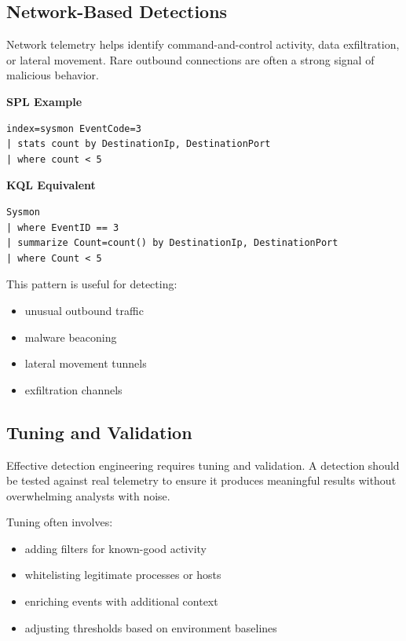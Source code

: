 
\subsection*{Network-Based Detections}

Network telemetry helps identify command-and-control activity, data exfiltration, or lateral movement. Rare outbound 
connections are often a strong signal of malicious behavior.

\textbf{SPL Example}

\begin{lstlisting}
index=sysmon EventCode=3
| stats count by DestinationIp, DestinationPort
| where count < 5
\end{lstlisting}

\textbf{KQL Equivalent}

\begin{lstlisting}
Sysmon
| where EventID == 3
| summarize Count=count() by DestinationIp, DestinationPort
| where Count < 5
\end{lstlisting}

This pattern is useful for detecting:

\begin{itemize}
    \item unusual outbound traffic
    \item malware beaconing
    \item lateral movement tunnels
    \item exfiltration channels
\end{itemize}


\subsection*{Tuning and Validation}

Effective detection engineering requires tuning and validation. A detection should be tested against real telemetry to 
ensure it produces meaningful results without overwhelming analysts with noise.

Tuning often involves:

\begin{itemize}
    \item adding filters for known-good activity
    \item whitelisting legitimate processes or hosts
    \item enriching events with additional context
    \item adjusting thresholds based on environment baselines
\end{itemize}

